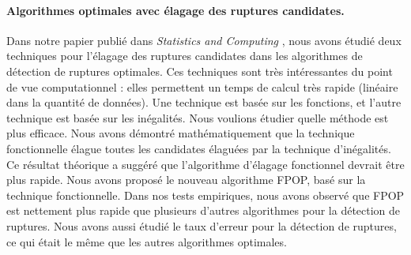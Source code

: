 \documentclass{article}
\begin{document}
\paragraph{Algorithmes optimales avec élagage des ruptures
  candidates.} Dans notre papier publié dans \emph{Statistics and
  Computing} \citep{fpop}, nous avons étudié deux techniques pour
l'élagage des ruptures candidates dans les algorithmes de détection de
ruptures optimales. Ces techniques sont très intéressantes du point de
vue computationnel : elles permettent un temps de calcul très rapide
(linéaire dans la quantité de données). Une technique est basée sur
les fonctions, et l'autre technique est basée sur les inégalités. Nous
voulions étudier quelle méthode est plus efficace. Nous avons démontré
mathématiquement que la technique fonctionnelle élague toutes les
candidates élaguées par la technique d'inégalités. Ce résultat
théorique a suggéré que l'algorithme d'élagage fonctionnel devrait
être plus rapide. Nous avons proposé le nouveau algorithme FPOP, basé
sur la technique fonctionnelle. Dans nos tests empiriques, nous avons
observé que FPOP est nettement plus rapide que plusieurs d'autres
algorithmes pour la détection de ruptures. Nous avons aussi étudié le
taux d'erreur pour la détection de ruptures, ce qui était le même que
les autres algorithmes optimales.
  


\end{document}
